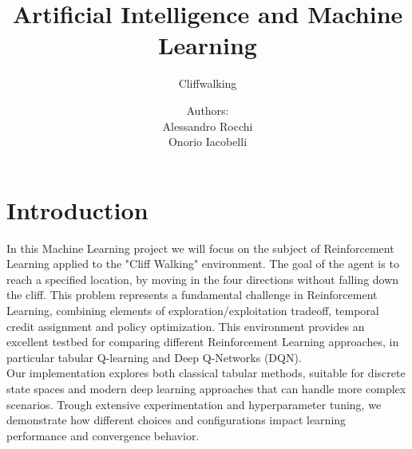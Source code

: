 \documentclass[a4paper,12pt]{article}
\title{Artificial Intelligence and Machine Learning}
\author{Cliffwalking}
\date{Authors:\\Alessandro Rocchi\\Onorio Iacobelli}
\begin{document}
\maketitle

\tableofcontents

\section{Introduction}
In this Machine Learning project we will focus on the subject of Reinforcement Learning applied to the "Cliff Walking" environment. The goal of the agent is to reach a specified location, by moving in the four directions without falling down the cliff. This problem represents a fundamental challenge in Reinforcement Learning, combining elements of exploration/exploitation tradeoff, temporal credit assignment and policy optimization. This environment provides an excellent testbed for comparing different Reinforcement Learning approaches, in particular tabular Q-learning and Deep Q-Networks (DQN).
\vspace{0,5cm}\\
Our implementation explores both classical tabular methods, suitable for discrete state spaces and modern deep learning approaches that can handle more complex scenarios. Trough extensive experimentation and hyperparameter tuning, we demonstrate how different choices and configurations impact learning performance and convergence behavior. 
\end{document}
